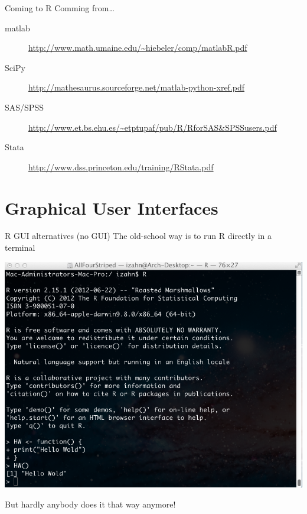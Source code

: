 \documentclass[table,smaller]{beamer}
\begin{document}
\begin{frame}[label=sec-1-3]{Coming to R}
Comming from\ldots{}
{\footnotesize
\begin{description}
\item[{matlab}] \url{http://www.math.umaine.edu/~hiebeler/comp/matlabR.pdf}
\item[{SciPy}] \url{http://mathesaurus.sourceforge.net/matlab-python-xref.pdf}
\item[{SAS/SPSS}] \url{http://www.et.bs.ehu.es/~etptupaf/pub/R/RforSAS&SPSSusers.pdf}
\item[{Stata}] \url{http://www.dss.princeton.edu/training/RStata.pdf}
\end{description}
}
\end{frame}
\section{Graphical User Interfaces}
\label{sec-2}


\begin{frame}[label=sec-2-1]{R GUI alternatives (no GUI)}
The old-school way is to run R directly in a terminal

\includegraphics[width=.75\textwidth]{images/Rconsole.png}

But hardly anybody does it that way anymore!
\end{frame}
\end{document}
